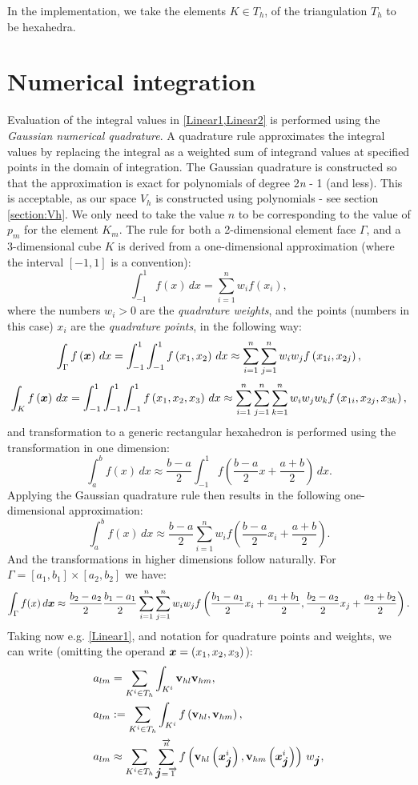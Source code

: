 In the implementation, we take the elements $K \in T_h$, of the triangulation $T_h$ to be hexahedra.
\section{Numerical integration}
Evaluation of the integral values in \cref{Linear1,Linear2} is performed using the \textit{Gaussian numerical quadrature}. A quadrature rule approximates the integral values by replacing the integral as a weighted sum of integrand values at specified points in the domain of integration. The Gaussian quadrature is constructed so that the approximation is exact for polynomials of degree 2\textit{n} - 1 (and less). This is acceptable, as our space $V_h$ is constructed using polynomials - see section \cref{section:Vh}. We only need to take the value $n$ to be corresponding to the value of $p_m$ for the element $K_m$. The rule for both a 2-dimensional element face $\Gamma$, and a 3-dimensional cube $K$ is derived from a one-dimensional approximation (where the interval $\left[-1, 1\right]$ is a convention):
$$
\int_{-1}^1 f(x)\,dx = \sum_{i=1}^n w_i f(x_i),
$$
where the numbers $w_i > 0$ are the \textit{quadrature weights}, and the points (numbers in this case) $x_i$ are the \textit{quadrature points}, in the following way:
$$
\int_{\Gamma} f\left(\mbox{\boldmath $x$}\right)\,dx = \int_{-1}^{1}\int_{-1}^{1} f\left( x_1, x_2\right)\,dx \approx \sum_{i=1}^n\sum_{j=1}^n w_i w_j f\left( x_{1i}, x_{2j}\right),
$$
$$
\int_{K} f\left(\mbox{\boldmath $x$}\right)\,dx = \int_{-1}^{1}\int_{-1}^{1}\int_{-1}^{1} f\left( x_1, x_2, x_3\right)\,dx \approx \sum_{i=1}^n\sum_{j=1}^n\sum_{k=1}^n w_i w_j w_k f\left( x_{1i}, x_{2j}, x_{3k}\right),
$$
and transformation to a generic rectangular hexahedron is performed using the transformation in one dimension:
$$
\int_a^b f(x)\,dx \approx \frac{b-a}{2} \int_{-1}^1 f\left(\frac{b-a}{2}x + \frac{a+b}{2}\right)\,dx.
$$
Applying the Gaussian quadrature rule then results in the following one-dimensional approximation:
$$
\int_a^b f(x)\,dx \approx \frac{b-a}{2} \sum_{i=1}^n w_i f\left(\frac{b-a}{2}x_i + \frac{a+b}{2}\right).
$$
And the transformations in higher dimensions follow naturally. For $\Gamma = \left[a_1, b_1\right] \times \left[a_2, b_2\right]$ we have:
$$
\int_{\Gamma} f(x)\,d\mbox{\boldmath $x$} \approx \frac{b_2-a_2}{2}\frac{b_1-a_1}{2} \sum_{i=1}^n \sum_{j=1}^n w_i w_j f\left(\frac{b_1-a_1}{2}x_i + \frac{a_1+b_1}{2},\frac{b_2-a_2}{2}x_j + \frac{a_2+b_2}{2}\right).
$$
Taking now e.g. \cref{Linear1}, and notation for quadrature points and weights, we can write (omitting the operand $\mbox{\boldmath $x$} = \left( x_1, x_2, x_3\right)$):
\begin{align}
a_{lm} & =  \sum_{K^i \in T_h}\int_{K^i} \mathrm{\mathbf{v}}_{hl} \mathrm{\mathbf{v}}_{hm}, \\
a_{lm} & := \sum_{K^i \in T_h}\int_{K^i} f\left(\mathrm{\mathbf{v}}_{hl}, \mathrm{\mathbf{v}}_{hm}\right) , \\
a_{lm} & \approx \sum_{K^i \in T_h} \sum_{\mbox{\boldmath $j$}=\overrightarrow{1}}^{\overrightarrow{n}} f\left(\mathrm{\mathbf{v}}_{hl}\left(\mbox{\boldmath $x$}_{\mbox{\boldmath $j$}}^i\right), \mathrm{\mathbf{v}}_{hm}\left(\mbox{\boldmath $x$}_{\mbox{\boldmath $j$}}^i\right)\right)\,w_{\mbox{\boldmath $j$}},\label{Final_Integration_Fn}
\end{align}
